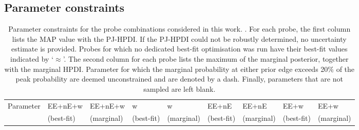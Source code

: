 \begin{appendix}
\section{Parameter constraints}
\label{app:parameter-constraints}
\begin{landscape}
\begin{table}
\begin{center}
\caption{Parameter constraints for the probe combinations considered in this work. . 
For each probe, the first column lists the MAP value with the PJ-HPDI. 
If the PJ-HPDI could not be robustly determined, no uncertainty estimate is provided. 
Probes for which no dedicated best-fit optimisation was run have their best-fit values indicated by `$\approx$'.
The second column for each probe lists the maximum of the marginal posterior, together with the marginal HPDI. 
Parameter for which the marginal probability at either prior edge exceeds 20\% of the peak probability are deemed unconstrained and are denoted by a dash. 
Finally, parameters that are not sampled are left blank.
}
\begin{tabular}{lllllllll}
    \toprule
    Parameter    & EE+nE+w & EE+nE+w& w & w& EE+nE & EE+nE& EE+w & EE+w \\ 
             & (best-fit) & (marginal)& (best-fit) & (marginal)& (best-fit) & (marginal)& (best-fit) & (marginal) \\ 


\end{tabular}
\end{center}
\end{table}
\end{landscape}
\end{appendix}
